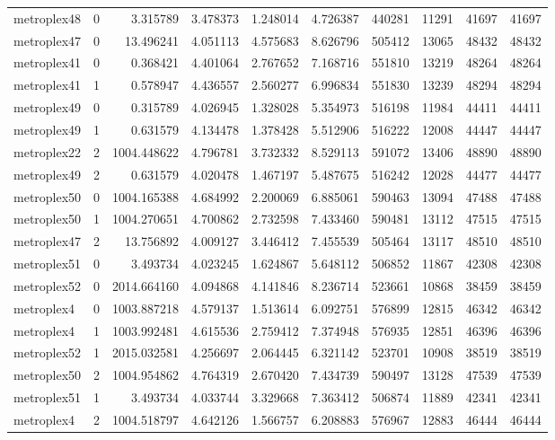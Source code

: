 \begin{longtable}{|l|r|r|r|r|r|r|r|r|r|}
metroplex48 & 0 & 3.315789 & 3.478373 & 1.248014 & 4.726387 & 440281 & 11291 & 41697 & 41697 \\
metroplex47 & 0 & 13.496241 & 4.051113 & 4.575683 & 8.626796 & 505412 & 13065 & 48432 & 48432 \\
metroplex41 & 0 & 0.368421 & 4.401064 & 2.767652 & 7.168716 & 551810 & 13219 & 48264 & 48264 \\
metroplex41 & 1 & 0.578947 & 4.436557 & 2.560277 & 6.996834 & 551830 & 13239 & 48294 & 48294 \\
metroplex49 & 0 & 0.315789 & 4.026945 & 1.328028 & 5.354973 & 516198 & 11984 & 44411 & 44411 \\
metroplex49 & 1 & 0.631579 & 4.134478 & 1.378428 & 5.512906 & 516222 & 12008 & 44447 & 44447 \\
metroplex22 & 2 & 1004.448622 & 4.796781 & 3.732332 & 8.529113 & 591072 & 13406 & 48890 & 48890 \\
metroplex49 & 2 & 0.631579 & 4.020478 & 1.467197 & 5.487675 & 516242 & 12028 & 44477 & 44477 \\
metroplex50 & 0 & 1004.165388 & 4.684992 & 2.200069 & 6.885061 & 590463 & 13094 & 47488 & 47488 \\
metroplex50 & 1 & 1004.270651 & 4.700862 & 2.732598 & 7.433460 & 590481 & 13112 & 47515 & 47515 \\
metroplex47 & 2 & 13.756892 & 4.009127 & 3.446412 & 7.455539 & 505464 & 13117 & 48510 & 48510 \\
metroplex51 & 0 & 3.493734 & 4.023245 & 1.624867 & 5.648112 & 506852 & 11867 & 42308 & 42308 \\
metroplex52 & 0 & 2014.664160 & 4.094868 & 4.141846 & 8.236714 & 523661 & 10868 & 38459 & 38459 \\
metroplex4 & 0 & 1003.887218 & 4.579137 & 1.513614 & 6.092751 & 576899 & 12815 & 46342 & 46342 \\
metroplex4 & 1 & 1003.992481 & 4.615536 & 2.759412 & 7.374948 & 576935 & 12851 & 46396 & 46396 \\
metroplex52 & 1 & 2015.032581 & 4.256697 & 2.064445 & 6.321142 & 523701 & 10908 & 38519 & 38519 \\
metroplex50 & 2 & 1004.954862 & 4.764319 & 2.670420 & 7.434739 & 590497 & 13128 & 47539 & 47539 \\
metroplex51 & 1 & 3.493734 & 4.033744 & 3.329668 & 7.363412 & 506874 & 11889 & 42341 & 42341 \\
metroplex4 & 2 & 1004.518797 & 4.642126 & 1.566757 & 6.208883 & 576967 & 12883 & 46444 & 46444 \\

\end{longtable}
